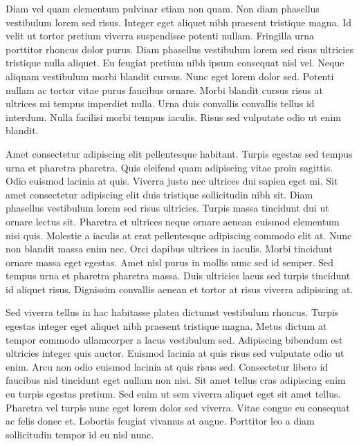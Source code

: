 Diam vel quam elementum pulvinar etiam non quam. Non diam phasellus vestibulum lorem sed risus. Integer eget aliquet nibh praesent tristique magna. Id velit ut tortor pretium viverra suspendisse potenti nullam. Fringilla urna porttitor rhoncus dolor purus. Diam phasellus vestibulum lorem sed risus ultricies tristique nulla aliquet. Eu feugiat pretium nibh ipsum consequat nisl vel. Neque aliquam vestibulum morbi blandit cursus. Nunc eget lorem dolor sed. Potenti nullam ac tortor vitae purus faucibus ornare. Morbi blandit cursus risus at ultrices mi tempus imperdiet nulla. Urna duis convallis convallis tellus id interdum. Nulla facilisi morbi tempus iaculis. Risus sed vulputate odio ut enim blandit.

Amet consectetur adipiscing elit pellentesque habitant. Turpis egestas sed tempus urna et pharetra pharetra. Quis eleifend quam adipiscing vitae proin sagittis. Odio euismod lacinia at quis. Viverra justo nec ultrices dui sapien eget mi. Sit amet consectetur adipiscing elit duis tristique sollicitudin nibh sit. Diam phasellus vestibulum lorem sed risus ultricies. Turpis massa tincidunt dui ut ornare lectus sit. Pharetra et ultrices neque ornare aenean euismod elementum nisi quis. Molestie a iaculis at erat pellentesque adipiscing commodo elit at. Nunc non blandit massa enim nec. Orci dapibus ultrices in iaculis. Morbi tincidunt ornare massa eget egestas. Amet nisl purus in mollis nunc sed id semper. Sed tempus urna et pharetra pharetra massa. Duis ultricies lacus sed turpis tincidunt id aliquet risus. Dignissim convallis aenean et tortor at risus viverra adipiscing at.

Sed viverra tellus in hac habitasse platea dictumst vestibulum rhoncus. Turpis egestas integer eget aliquet nibh praesent tristique magna. Metus dictum at tempor commodo ullamcorper a lacus vestibulum sed. Adipiscing bibendum est ultricies integer quis auctor. Euismod lacinia at quis risus sed vulputate odio ut enim. Arcu non odio euismod lacinia at quis risus sed. Consectetur libero id faucibus nisl tincidunt eget nullam non nisi. Sit amet tellus cras adipiscing enim eu turpis egestas pretium. Sed enim ut sem viverra aliquet eget sit amet tellus. Pharetra vel turpis nunc eget lorem dolor sed viverra. Vitae congue eu consequat ac felis donec et. Lobortis feugiat vivamus at augue. Porttitor leo a diam sollicitudin tempor id eu nisl nunc.

